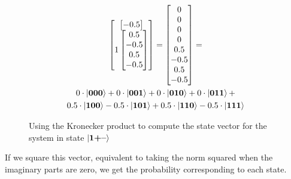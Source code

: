 \begin{figure}[H]
\begin{gather*}
\begin{bmatrix}
\begin{bmatrix}
                -0.5\\
            \end{bmatrix}\\
            1
            \begin{bmatrix}
                0.5\\
                -0.5\\
                0.5\\
                -0.5\\
            \end{bmatrix}\\
        \end{bmatrix}= 
        \begin{bmatrix}
            0\\
            0\\
            0\\
            0\\
            0.5\\
            -0.5\\
            0.5\\
            -0.5\\
        \end{bmatrix}
        =\\
        0\cdot\ket{\mathbf{000}} + 0\cdot\ket{\mathbf{001}}+ 0\cdot\ket{\mathbf{010}}+ 0\cdot\ket{\mathbf{011}}+\\
        0.5\cdot\ket{\mathbf{100}}- 0.5\cdot\ket{\mathbf{101}}+ 0.5\cdot\ket{\mathbf{110}}- 0.5\cdot\ket{\mathbf{111}}
    \end{gather*}
    \caption{Using the Kronecker product to compute the state vector for the system in state $\ket{\mathbf{1}\textbf{+}\textbf{--}}$}
    \label{fig:multi_qubit_state_computation}
\end{figure}
\noindent
If we square this vector, equivalent to taking the norm squared when the imaginary parts are zero, we get the probability corresponding to each state. 
